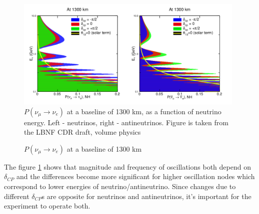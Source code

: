 \begin{figure}
\caption{$P(\nu_\mu \rightarrow \nu_e)$ at a baseline of 1300 km}
\label{fig:LBNF_oscProbability}
\centering
\includegraphics[width=0.98\textwidth, keepaspectratio=true]{figs/LBNF_oscProbability.png}
\\$P(\nu_\mu \rightarrow \nu_e)$ at a baseline of 1300 km, as a function of neutrino energy. Left - neutrinos, right - antineutrinos. Figure is taken from the LBNF CDR draft, volume physics\cite{ref_LBNFdoc_volume-physics}
\end{figure}

The figure \ref{fig:LBNF_oscProbability} shows that magnitude and frequency of oscillations both depend on $\delta_{CP}$ and the differences become more significant for higher oscillation nodes which correspond to lower energies of neutrino/antineutrino. Since changes due to different $\delta_{CP}$s are opposite for neutrinos and antineutrinos, it's important for the experiment to operate both.\\

